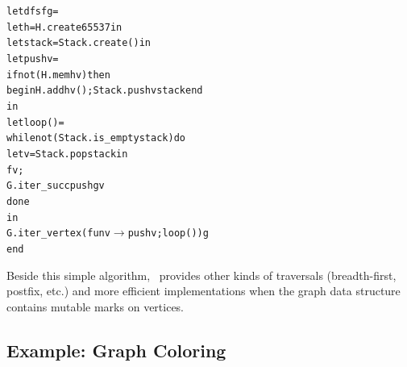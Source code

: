 \begin{alltt}
  let dfs f g = 
    let h = H.create 65537 in
    let stack = Stack.create () in
    let push v = 
      if not (H.mem h v) then 
      begin H.add h v (); Stack.push v stack end
    in
    let loop () =
      while not (Stack.is_empty stack) do
        let v = Stack.pop stack in
        f v;
        G.iter_succ push g v
      done
    in
    G.iter_vertex (fun v \ensuremath{\rightarrow} push v; loop ()) g
end
\end{alltt}
Beside this simple algorithm, \ocamlgraph\ provides other kinds of
traversals (breadth-first, postfix, etc.) and more efficient
implementations when the graph data structure contains mutable marks
on vertices.

\subsection{Example: Graph Coloring}
\label{XII:coloring}

